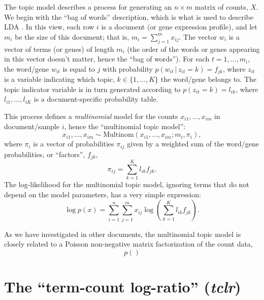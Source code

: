 \documentclass[final]{siamart171218}
\begin{document}
The topic model describes a process for generating an $n \times m$
matrix of counts, $X$. We begin with the ``bag of words'' description,
which is what is used to describe LDA \cite{blei-2003}. In this view,
each row $i$ is a document (or gene expression profile), and let $m_i$
be the size of this document; that is, $m_i = \sum_{j=1}^m
x_{ij}$. The vector $w_i$ is a vector of terms (or genes) of length
$m_i$ (the order of the words or genes appearing in this vector
doesn't matter, hence the ``bag of words''). For each $t = 1, \ldots,
m_{i}$, the word/gene $w_{it}$ is equal to $j$ with probability
$p(w_{it} \,|\, z_{it} = k) = f_{jk}$, where $z_{it}$ is a variable
indicating which topic, $k \in \{1, \ldots, K\}$ the word/gene belongs
to. The topic indicator variable is in turn generated according to
$p(z_{it} = k) = l_{ik}$, where $l_{i1}, \ldots, l_{iK}$ is a
document-specific probability table.

This process defines a {\em multinomial} model for the 
counts $x_{i1}, \ldots, x_{im}$ in document/sample $i$, hence the
``multinomial topic model'':
\begin{equation}
x_{i1}, \ldots, x_{im} \sim
\mathrm{Multinom}(x_{i1}, \ldots, x_{im}; m_i, \pi_i),
\end{equation}
where $\pi_i$ is a vector of probabilities $\pi_{ij}$ given by a
weighted sum of the word/gene probabilities, or ``factors'', $f_{jk}$,
\begin{equation}
\pi_{ij} = \sum_{k=1}^K l_{ik} f_{jk}.
\end{equation}
The log-likelihood for the multinomial topic model, ignoring terms
that do not depend on the model parameters, has a very simple
expression:
\begin{equation}
\log p(x) = \sum_{i=1}^n \sum_{j=1}^m
x_{ij} \log({\textstyle \sum_{k=1}^K l_{ik} f_{jk}}).
\end{equation}

As we have investigated in other documents, the multinomial topic
model is closely related to a Poisson non-negative matrix
factorization of the count data,
\begin{equation}
p()
\end{equation}

\section{The ``term-count log-ratio'' ({\em tclr})}
\end{document}
